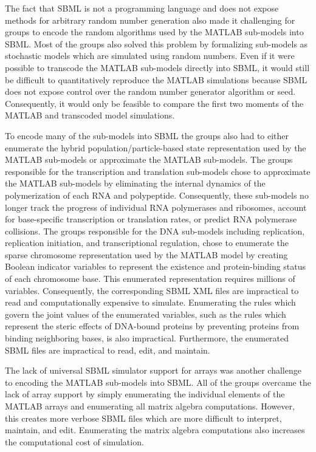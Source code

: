 \documentclass[journal,transmag]{IEEEtran}
\begin{document}
The fact that SBML is not a programming language and does not expose methods for arbitrary random number generation also made it challenging for groups to encode the random algorithms used by the MATLAB sub-models into SBML. Most of the groups also solved this problem by formalizing sub-models as stochastic models which are simulated using random numbers. Even if it were possible to transcode the MATLAB sub-models directly into SBML, it would still be difficult to quantitatively reproduce the MATLAB simulations because SBML does not expose control over the random number generator algorithm or seed. Consequently, it would only be feasible to compare the first two moments of the MATLAB and transcoded model simulations.

To encode many of the sub-models into SBML the groups also had to either enumerate the hybrid population/particle-based state representation used by the MATLAB sub-models or approximate the MATLAB sub-models. The groups responsible for the transcription and translation sub-models chose to approximate the MATLAB sub-models by eliminating the internal dynamics of the polymerization of each RNA and polypeptide. Consequently, these sub-models no longer track the progress of individual RNA polymerases and ribosomes, account for base-specific transcription or translation rates, or predict RNA polymerase collisions. The groups responsible for the DNA sub-models including replication, replication initiation, and transcriptional regulation, chose to enumerate the sparse chromosome representation used by the MATLAB model by creating Boolean indicator variables to represent the existence and protein-binding status of each chromosome base. This enumerated representation requires millions of variables. Consequently, the corresponding SBML XML files are impractical to read and computationally expensive to simulate. Enumerating the rules which govern the joint values of the enumerated variables, such as the rules which represent the steric effects of DNA-bound proteins by preventing proteins from binding neighboring bases, is also impractical. Furthermore, the enumerated SBML files are impractical to read, edit, and maintain.

The lack of universal SBML simulator support for arrays was another challenge to encoding the MATLAB sub-models into SBML. All of the groups overcame the lack of array support by simply enumerating the individual elements of the MATLAB arrays and enumerating all matrix algebra computations. However, this creates more verbose SBML files which are more difficult to interpret, maintain, and edit. Enumerating the matrix algebra computations also increases the computational cost of simulation.
\end{document}
